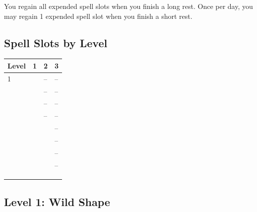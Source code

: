 \documentclass[12pt,letterpaper,twocolumn,openany,nodeprecatedcode,bg=none]{dndbook}
\let\oldsubsection\subsection
\renewcommand{\subsection}[1]{%
  \needspace{5\baselineskip}%
  \oldsubsection{#1}%
}
\begin{document}
You regain all expended spell slots when you finish a long rest. Once
per day, you may regain 1 expended spell slot when you finish a short
rest.

\subsection{Spell Slots by Level}\label{spell-slots-by-level}


{\def\LTcaptype{none} %
\begin{table}[!htbp]
\centering
\begin{tabular}{@{}
  >{\raggedright\arraybackslash}p{}
  >{\raggedright\arraybackslash}p{}
  >{\raggedright\arraybackslash}p{}
  >{\raggedright\arraybackslash}p{}@{}}
\toprule\noalign{}
\begin{minipage}[b]{\linewidth}\raggedright
Level
\end{minipage} & \begin{minipage}[b]{\linewidth}\raggedright
1
\end{minipage} & \begin{minipage}[b]{\linewidth}\raggedright
2
\end{minipage} & \begin{minipage}[b]{\linewidth}\raggedright
3
\end{minipage} \\
\midrule\noalign{}
1 & 2 & -- & -- \\
2 & 2 & -- & -- \\
3 & 3 & -- & -- \\
4 & 3 & -- & -- \\
5 & 4 & 2 & -- \\
6 & 4 & 2 & -- \\
7 & 4 & 3 & -- \\
8 & 4 & 3 & -- \\
9 & 4 & 3 & 2 \\
10 & 4 & 3 & 2 \\
\bottomrule\noalign{}
\end{tabular}
\end{table}
}

\subsection{Level 1: Wild Shape}\label{level-1-wild-shape}
\end{document}
